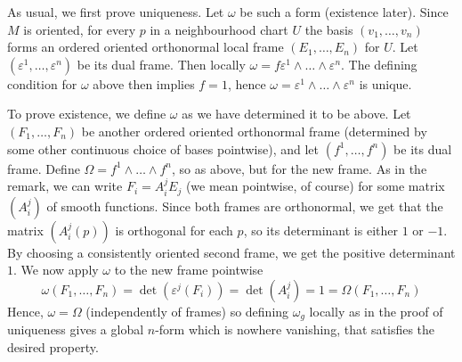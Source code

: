 \documentclass[a4paper, 12pt]{article}
\begin{document}
\begin{Exercise}
\begin{enumerate}[label=(\roman*)]
            As usual, we first prove uniqueness.
            Let $\omega$ be such a form (existence later).
            Since $M$ is oriented, for every $p$ in a neighbourhood chart $U$ the basis $(v_1,\dots,v_n)$ forms an ordered oriented orthonormal local frame $(E_1,\dots,E_n)$ for $U$.
            Let $(\varepsilon^1,\dots,\varepsilon^n)$ be its dual frame.
            Then locally $\omega = f \varepsilon^1 \wedge \dots \wedge \varepsilon^n$.
            The defining condition for $\omega$ above then implies $f = 1$, hence $\omega = \varepsilon^1\wedge\dots\wedge\varepsilon^n$ is unique.

            To prove existence, we define $\omega$ as we have determined it to be above.
            Let $(F_1,\dots,F_n)$ be another ordered oriented orthonormal frame (determined by some other continuous choice of bases pointwise),
            and let $(f^1,\dots,f^n)$ be its dual frame.
            Define $\Omega = f^1\wedge\dots\wedge f^n$, so as above, but for the new frame.
            As in the remark, we can write $F_i = A_i^j E_j$ (we mean pointwise, of course) for some matrix $(A_i^j)$ of smooth functions.
            Since both frames are orthonormal, we get that the matrix $(A_i^j(p))$ is orthogonal for each $p$,
            so its determinant is either $1$ or $-1$.
            By choosing a consistently oriented second frame, we get the positive determinant $1$.
            We now apply $\omega$ to the new frame pointwise
            \[
                \omega(F_1,\dots,F_n) = \det(\varepsilon^j(F_i)) = \det(A_i^j) = 1 = \Omega(F_1,\dots,F_n)
            \]
            Hence, $\omega = \Omega$ (independently of frames) so defining $\omega_g$ locally as in the proof of uniqueness gives a global $n$-form which is nowhere vanishing, that satisfies the desired property.
    \end{enumerate}
\end{Exercise}
\end{document}
